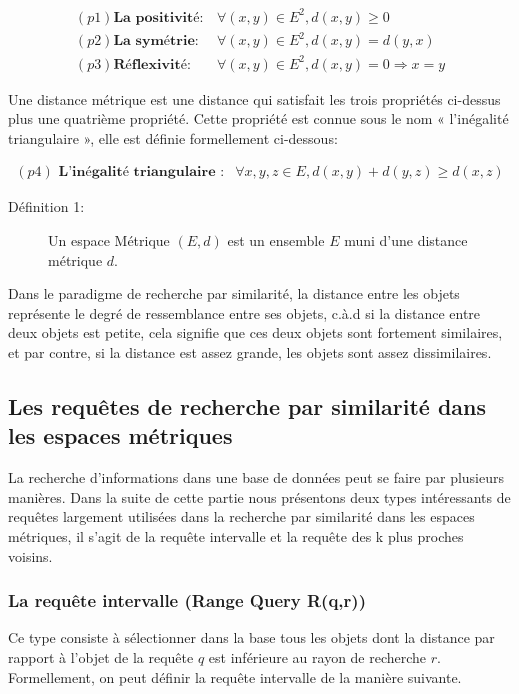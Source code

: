 \begin{equation}
	\begin{array}{cc}
	(p1) \textbf{La positivité} : & \forall (x,y)\in E^2, d(x,y) \ge 0 \\
	(p2) \textbf{La symétrie} : & \forall (x,y)\in E^2, d(x,y) = d(y,x) \\
	(p3) \textbf{Réflexivité} : & \forall (x,y)\in E^2, d(x,y) = 0 \Rightarrow x = y
	\end{array}
\end{equation}

Une distance métrique est une distance qui satisfait les trois propriétés ci-dessus plus une quatrième propriété. Cette propriété est connue sous le nom « l’inégalité triangulaire », elle est définie formellement ci-dessous:

\begin{equation}
\begin{array}{cc}
(p4)\textbf{ L’inégalité triangulaire :}  & \forall x,y,z\in E, d(x,y)+d(y,z) \geq d(x,z)
\end{array}
\end{equation}

\begin{description}
	\item[Définition 1:] Un espace Métrique $ (E,d) $ est un ensemble $ E $ muni d’une distance métrique $ d $.
\end{description}

Dans le paradigme de recherche par similarité, la distance entre les objets représente le degré de ressemblance entre ses objets, c.à.d si la distance entre deux objets est petite, cela signifie que ces deux objets sont fortement similaires, et par contre, si la distance est assez grande, les objets sont assez dissimilaires.

\subsection{Les requêtes de recherche par similarité dans les espaces métriques}
La recherche d’informations dans une base de données peut se faire par plusieurs manières. Dans la suite de cette partie nous présentons deux types intéressants de requêtes largement utilisées dans la recherche par similarité dans les espaces métriques, il s’agit de la requête intervalle et la requête des k plus proches voisins.

\subsubsection{La requête intervalle (Range Query R(q,r))}
Ce type consiste à sélectionner dans la base tous les objets dont la distance par rapport à l’objet de la requête $ q $ est inférieure au rayon de recherche $ r $. Formellement, on peut définir la requête intervalle de la manière suivante.\\

